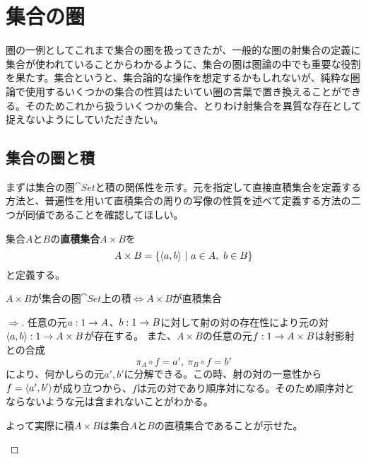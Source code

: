 \section{集合の圏}

  圏の一例としてこれまで集合の圏を扱ってきたが、一般的な圏の射集合の定義に集合が使われていることからわかるように、集合の圏は圏論の中でも重要な役割を果たす。集合というと、集合論的な操作を想定するかもしれないが、純粋な圏論で使用するいくつかの集合の性質はたいてい圏の言葉で置き換えることができる。そのためこれから扱ういくつかの集合、とりわけ射集合を異質な存在として捉えないようにしていただきたい。

  \subsection{集合の圏と積}
	まずは集合の圏$\cat{Set}$と積の関係性を示す。元を指定して直接直積集合を定義する方法と、普遍性を用いて直積集合の周りの写像の性質を述べて定義する方法の二つが同値であることを確認してほしい。
	\begin{define}[直積集合]
		集合$A$と$B$の\textbf{直積集合}$A\times B$を\[A\times B =\{\langle a,b\rangle\ |\ a\in A,\ b\in B\}\]と定義する。
	\end{define}
	\begin{prop}[直積と積の同値性]
    $A\times B$が集合の圏$\cat{Set}$上の積$\iff A\times B$が直積集合
	\end{prop}
	\begin{proof}[$\Longrightarrow$]
		任意の元$a:1\rightarrow A$、$b:1\rightarrow B$に対して射の対の存在性により元の対$\langle a,b\rangle:1\rightarrow A\times B$が存在する。
		また、$A\times B$の任意の元$f:1\rightarrow A\times B$は射影射との合成\[\pi_A\circ f=a',\ \pi_B\circ f=b'\]により、何かしらの元$a',b'$に分解できる。この時、射の対の一意性から$f=\langle a',b'\rangle$が成り立つから、$f$は元の対であり順序対になる。そのため順序対とならないような元は含まれないことがわかる。

		よって実際に積$A\times B$は集合$A$と$B$の直積集合であることが示せた。
		\begin{center}
		\end{center}
	\end{proof}
